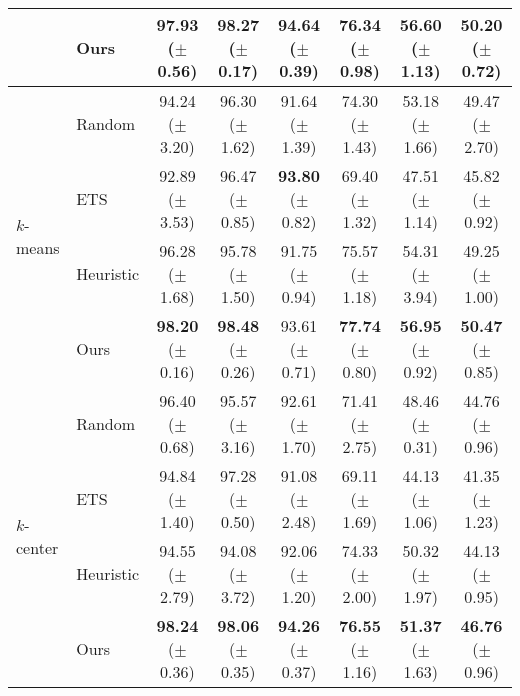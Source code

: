 \begin{table}[t]
{\begin{tabular}{l l c c c c c c}
     & Ours &  {\bf 97.93} {\scriptsize ($\pm$ 0.56)} &  {\bf 98.27} {\scriptsize ($\pm$ 0.17)} & {\bf 94.64} {\scriptsize ($\pm$ 0.39)} & 76.34 {\scriptsize ($\pm$ 0.98)} & 56.60 {\scriptsize ($\pm$ 1.13)} & {\bf 50.20} {\scriptsize ($\pm$ 0.72)} \\
    \midrule 
    \multirow{4}{*}{$k$-means} & Random & 94.24 {\scriptsize ($\pm$ 3.20)} & 96.30 {\scriptsize ($\pm$ 1.62)} & 91.64 {\scriptsize ($\pm$ 1.39)} & 74.30 {\scriptsize ($\pm$ 1.43)} & 53.18 {\scriptsize ($\pm$ 1.66)} & 49.47 {\scriptsize ($\pm$ 2.70)}  \\ 
     & ETS  & 92.89 {\scriptsize ($\pm$ 3.53)} & 96.47 {\scriptsize ($\pm$ 0.85)} & {\bf 93.80} {\scriptsize ($\pm$ 0.82)} & 69.40 {\scriptsize ($\pm$ 1.32)} & 47.51 {\scriptsize ($\pm$ 1.14)} & 45.82 {\scriptsize ($\pm$ 0.92)} \\
     & Heuristic &  96.28 {\scriptsize ($\pm$ 1.68)} &  95.78 {\scriptsize ($\pm$ 1.50)}  & 91.75 {\scriptsize ($\pm$ 0.94)} & 75.57 {\scriptsize ($\pm$ 1.18)} & 54.31 {\scriptsize ($\pm$  3.94)} & 49.25 {\scriptsize ($\pm$ 1.00)} \\
    & Ours & {\bf 98.20} {\scriptsize ($\pm$ 0.16)} & {\bf 98.48} {\scriptsize ($\pm$ 0.26)} &  93.61 {\scriptsize ($\pm$ 0.71)} & {\bf 77.74} {\scriptsize ($\pm$ 0.80)} & {\bf 56.95} {\scriptsize ($\pm$ 0.92)} & {\bf 50.47} {\scriptsize ($\pm$ 0.85)} \\  
    \midrule 
    \multirow{4}{*}{$k$-center} & Random & 96.40 {\scriptsize ($\pm$ 0.68)} & 95.57 {\scriptsize ($\pm$ 3.16)}  & 92.61 {\scriptsize ($\pm$ 1.70)} & 71.41 {\scriptsize ($\pm$ 2.75)} & 48.46 {\scriptsize ($\pm$ 0.31)} & 44.76 {\scriptsize ($\pm$ 0.96)} \\ 
     & ETS  & 94.84 {\scriptsize ($\pm$ 1.40)} & 97.28 {\scriptsize ($\pm$ 0.50)} & 91.08 {\scriptsize ($\pm$ 2.48)} & 69.11 {\scriptsize ($\pm$ 1.69)} & 44.13 {\scriptsize ($\pm$ 1.06)} & 41.35 {\scriptsize ($\pm$ 1.23)} \\
     & Heuristic & 94.55 {\scriptsize ($\pm$ 2.79)} & 94.08 {\scriptsize ($\pm$ 3.72)} & 92.06 {\scriptsize ($\pm$ 1.20)} & 74.33 {\scriptsize ($\pm$ 2.00)} & 50.32 {\scriptsize ($\pm$ 1.97)} & 44.13 {\scriptsize ($\pm$ 0.95)} \\
     & Ours & {\bf 98.24} {\scriptsize ($\pm$ 0.36)} & {\bf 98.06} {\scriptsize ($\pm$ 0.35)} & {\bf 94.26} {\scriptsize ($\pm$ 0.37)} & {\bf 76.55} {\scriptsize ($\pm$ 1.16)} & {\bf 51.37} {\scriptsize ($\pm$ 1.63)} & {\bf 46.76} {\scriptsize ($\pm$ 0.96)}  \\  
    \midrule 

\end{tabular}}
\end{table}

